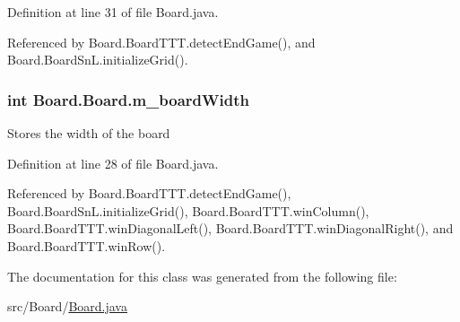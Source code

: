 Definition at line 31 of file Board.\+java.



Referenced by Board.\+Board\+T\+T\+T.\+detect\+End\+Game(), and Board.\+Board\+Sn\+L.\+initialize\+Grid().

\hypertarget{class_board_1_1_board_a811ddc59658729b3cdb0a2db75465334}{}
\subsubsection[{m\+\_\+board\+Width}]{\setlength{\rightskip}{0pt plus 5cm}int Board.\+Board.\+m\+\_\+board\+Width\hspace{0.3cm}{\ttfamily [protected]}}\label{class_board_1_1_board_a811ddc59658729b3cdb0a2db75465334}
Stores the width of the board 

Definition at line 28 of file Board.\+java.



Referenced by Board.\+Board\+T\+T\+T.\+detect\+End\+Game(), Board.\+Board\+Sn\+L.\+initialize\+Grid(), Board.\+Board\+T\+T\+T.\+win\+Column(), Board.\+Board\+T\+T\+T.\+win\+Diagonal\+Left(), Board.\+Board\+T\+T\+T.\+win\+Diagonal\+Right(), and Board.\+Board\+T\+T\+T.\+win\+Row().



The documentation for this class was generated from the following file\+:\begin{DoxyCompactItemize}
\item 
src/\+Board/\hyperlink{_board_8java}{Board.\+java}\end{DoxyCompactItemize}
